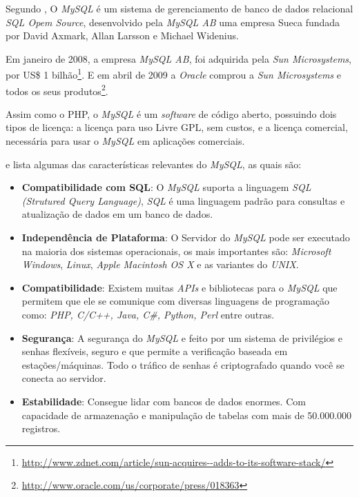 Segundo , O \textit{MySQL} é um sistema de gerenciamento de banco de dados relacional \textit{SQL Opem Source}, desenvolvido pela \textit{MySQL AB} uma empresa Sueca fundada por David Axmark, Allan Larsson e Michael Widenius.

Em janeiro de 2008, a empresa \textit{MySQL AB}, foi adquirida pela \textit{Sun Microsystems}, por US\$ 1 bilhão\footnote{\url{http://www.zdnet.com/article/sun-acquires--adds-to-its-software-stack/}}. E em abril de 2009 a \textit{Oracle} comprou a \textit{Sun Microsystems} e todos os seus produtos\footnote{\url{http://www.oracle.com/us/corporate/press/018363}}.

Assim como o PHP, o \textit{MySQL} é um \textit{software} de código aberto, possuindo dois tipos de licença: a licença para uso Livre \ac{GPL}, sem custos, e a licença comercial, necessária para usar o \textit{MySQL} em aplicações comerciais.

 e  lista algumas das características relevantes do \textit{MySQL}, as quais são:
\begin{itemize}
    \item \textbf{Compatibilidade com SQL}: O \textit{MySQL} suporta a linguagem \textit{SQL (Strutured Query Language)}, \textit{SQL} é uma linguagem padrão para consultas e atualização de dados em um banco de dados.
    \item \textbf{Independência de Plataforma}: O Servidor do \textit{MySQL} pode ser executado na maioria dos sistemas operacionais, os mais importantes são: \textit{Microsoft Windows}, \textit{Linux}, \textit{Apple Macintosh OS X} e as variantes do \textit{UNIX}.
    \item \textbf{Compatibilidade}: Existem muitas \textit{APIs} e bibliotecas para o \textit{MySQL} que permitem que ele se comunique com diversas linguagens de programação como: \textit{PHP, C/C++, Java, C\#, Python, Perl} entre outras.
    \item \textbf{Segurança}: A segurança do \textit{MySQL} e feito por um sistema de privilégios e senhas flexíveis, seguro e que permite a verificação baseada em estações/máquinas. Todo o tráfico de senhas é criptografado quando você se conecta ao servidor.
    \item \textbf{Estabilidade}: Consegue lidar com bancos de dados enormes. Com capacidade de armazenação e manipulação de tabelas com mais de 50.000.000 registros.
\end{itemize}



